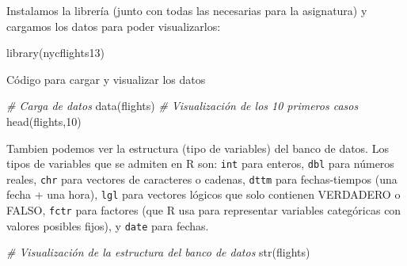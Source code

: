 \documentclass[
]{book}
\newenvironment{Shaded}{\begin{snugshade}}{\end{snugshade}}
\newcommand{\CommentTok}[1]{\textcolor[rgb]{0.56,0.35,0.01}{\textit{#1}}}
\newcommand{\DecValTok}[1]{\textcolor[rgb]{0.00,0.00,0.81}{#1}}
\newcommand{\FunctionTok}[1]{\textcolor[rgb]{0.00,0.00,0.00}{#1}}
\newcommand{\NormalTok}[1]{#1}
\begin{document}
Instalamos la librería (junto con todas las necesarias para la asignatura) y cargamos los datos para poder visualizarlos:

\begin{Shaded}
\begin{Highlighting}[]
\FunctionTok{library}\NormalTok{(nycflights13)}
\end{Highlighting}
\end{Shaded}

Código para cargar y visualizar los datos

\begin{Shaded}
\begin{Highlighting}[]
\CommentTok{\# Carga de datos}
\FunctionTok{data}\NormalTok{(flights)}
\CommentTok{\# Visualización de los 10 primeros casos}
\FunctionTok{head}\NormalTok{(flights,}\DecValTok{10}\NormalTok{)}
\end{Highlighting}
\end{Shaded}

Tambien podemos ver la estructura (tipo de variables) del banco de datos. Los tipos de variables que se admiten en R son: \texttt{int} para enteros, \texttt{dbl} para números reales, \texttt{chr} para vectores de caracteres o cadenas, \texttt{dttm} para fechas-tiempos (una fecha + una hora), \texttt{lgl} para vectores lógicos que solo contienen VERDADERO o FALSO, \texttt{fctr} para factores (que R usa para representar variables categóricas con valores posibles fijos), y \texttt{date} para fechas.

\begin{Shaded}
\begin{Highlighting}[]
\CommentTok{\# Visualización de la estructura del banco de datos}
\FunctionTok{str}\NormalTok{(flights)}
\end{Highlighting}
\end{Shaded}
\end{document}
